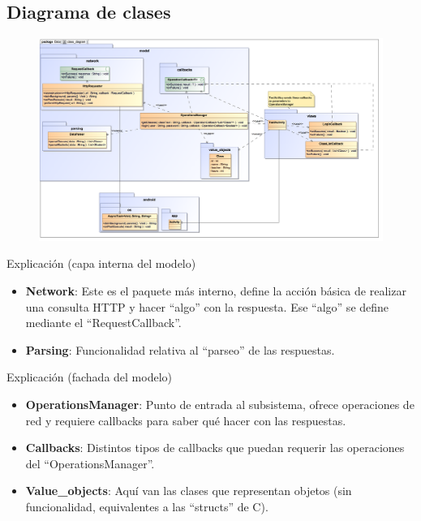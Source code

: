\documentclass{beamer}
\begin{document}
\subsection{Diagrama de clases}
\begin{frame}
\begin{figure}
\begin{center}
\includegraphics[scale=0.35]{../observer-pattern/diagrams/class_diagram}
\end{center}
\end{figure}
\end{frame}

\begin{frame}{Explicación (capa interna del modelo)}
\begin{itemize}
\item {\bf Network}: Este es el paquete más interno, define la acción básica de realizar una consulta HTTP y hacer ``algo'' con la respuesta. Ese ``algo'' se define mediante el ``RequestCallback''.
\item {\bf Parsing}: Funcionalidad relativa al ``parseo'' de las respuestas. 
\end{itemize} 
\end{frame}

\begin{frame}{Explicación (fachada del modelo)}
\begin{itemize}
\item {\bf OperationsManager}: Punto de entrada al subsistema, ofrece operaciones de red y requiere callbacks para saber qué hacer con las respuestas.
\item {\bf Callbacks}: Distintos tipos de callbacks que puedan requerir las operaciones del ``OperationsManager''.
\item {\bf Value\_objects}: Aquí van las clases que representan objetos (sin funcionalidad, equivalentes a las ``structs'' de C).
\end{itemize} 
\end{frame}
\end{document}
